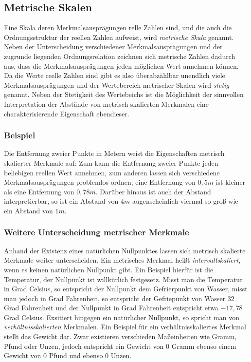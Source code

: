 \documentclass[fontsize=11pt]{scrartcl}
\begin{document}
                \subsection{Metrische Skalen}
                    Eine Skala deren Merkmalsausprägungen relle Zahlen sind, und die auch die Ordnungsstruktur der reellen Zahlen aufweist, wird \emph{metrische Skala} genannt. Neben der Unterscheidung verschiedener Merkmalsausprägungen und der zugrunde liegenden Ordnungsrelation zeichnen sich metrische Zahlen dadurch aus, dass die Merkmalsausprägungen jeden möglichen Wert annehmen können. Da die Werte reelle Zahlen sind gibt es also überabzählbar unendlich viele Merkmalsausprägungen und der Wertebereich metrischer Skalen wird \emph{stetig} genannt. Neben der Stetigkeit des Wertebeichs ist die Möglichkeit der sinnvollen Interpretation der Abstände von metrisch skalierten Merkmalen eine charakterisierende Eigenschaft ebendieser.
                    \cite{kohn2005}
                    \subsubsection{Beispiel}
                        Die Entfernung zweier Punkte in Metern weist die Eigenschaften metrisch skalierter Merkmale auf: Zum kann die Entfernung zweier Punkte jeden beliebigen reellen Wert annehmen, zum anderen lassen sich verschiedene Merkmalsausprägungen problemlos ordnen; eine Entfernung von $ 0,5m $ ist kleiner als eine Entfernung von $ 0,78m $. Darüber hinaus ist auch der Abstand interpretierbar, so ist ein Abstand von $4m$ augenscheinlich viermal so groß wie ein Abstand von $1m$.
                    \subsubsection{Weitere Unterscheidung metrischer Merkmale}
                        Anhand der Existenz eines natürlichen Nullpunktes lassen sich metrisch skalierte Merkmale weiter unterscheiden. Ein metrisches Merkmal heißt \emph{intervallskaliert}, wenn es keinen natürlichen Nullpunkt gibt. \cite{kohn2005} Ein Beispiel hierfür ist die Temperatur, der Nullpunkt ist willkürlich festgesetz. Misst man die Temperatur in Grad Celsius, so entspricht der Nullpunkt dem Gefrierpunkt von Wasser, misst man jedoch in Grad Fahrenheit, so entspricht der Gefriepunkt von Wasser $32$ Grad Fahrenheit und der Nullpunkt in Grad Fahrenheit entspricht etwa $-17,78$ Grad Celsius.
                        \newline
                        Exsitiert hingegen ein natürlicher Nullpunkt, so spricht man von \emph{verhältnisskalierten} Merkmalen. \cite{kohn2005}
                        \newline
                        Ein Beispiel für ein verhältnisskaliertes Merkmal stellt das Gewicht dar. Zwar existieren verschieden Maßeinheiten wie Gramm, Pfund oder Unzen, jedoch entspricht ein Gewicht von $0$ Gramm ebenso einem Gewicht von $0$ Pfund und ebenso $0$ Unzen.
                
\end{document}
